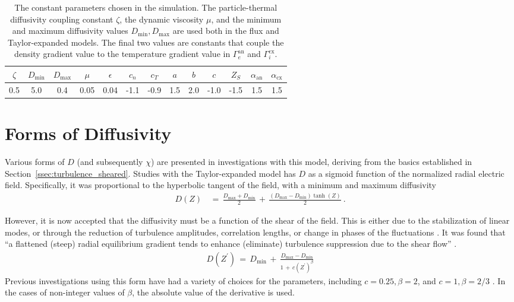 \begin{table}[h] %
\centering
	\begin{tabular}{cccc|ccccccc|cc}
		$\zeta$ & $D_\text{min}$ & $D_\text{max}$ & $\mu$ & $\epsilon$ & $c_n$ & $c_T$ & $a$ & $b$ & $c$ & $Z_S$ & $\alpha_\text{an}$ & $\alpha_\text{cx}$ \\ \hline
		0.5 & 5.0 & 0.4 & 0.05 & 0.04 & -1.1 & -0.9 & 1.5 & 2.0 & -1.0 & -1.5 & 1.5 & 1.5
	\end{tabular}
	\caption{The constant parameters chosen in the simulation.
	The particle-thermal diffusivity coupling constant $\zeta$, the dynamic viscosity $\mu$, and the minimum and maximum diffusivity values $D_\text{min}, D_\text{max}$ are used both in the flux and Taylor-expanded models.
	The final two values are constants that couple the density gradient value to the temperature gradient value in $\Gamma_e^\text{an}$ and $\Gamma_i^\text{cx}$.}
	\label{table:constants}
\end{table}

\section{Forms of Diffusivity}\label{sec:diffusivity}
Various forms of $D$ (and subsequently $\chi$) are presented in investigations with this model, deriving from the basics established in Section~\ref{ssec:turbulence_sheared}.
Studies with the Taylor-expanded model has $D$ as a sigmoid function of the normalized radial electric field.
Specifically, it was proportional to the hyperbolic tangent of the field, with a minimum and maximum diffusivity \cite{itoh_edge_1991, zohm_dynamic_1994}
\begin{align} %
	D(Z) \,&=\, \frac{D_\text{max} + D_\text{min}}{2} \,+\,
		\frac{(D_\text{max} - D_\text{min})\tanh(Z)}{2}~.
		\label{eq:Itoh_diffusivity}
\end{align}

However, it is now accepted that the diffusivity must be a function of the shear of the field.
This is either due to the stabilization of linear modes, or through the reduction of turbulence amplitudes, correlation lengths, or change in phases of the fluctuations \cite{connor_review_2000}.
It was found that ``a flattened (steep) radial equilibrium gradient tends to enhance (eliminate) turbulence suppression due to the shear flow'' \cite{zhang_edge_1992}.
\begin{align} %
	D(Z^{\prime}) \,=\, D_\text{min} \,+\, \frac{D_\text{max} - D_\text{min}}
		{1 \,+\, c(Z^{\prime})^{\beta}} \label{eq:shear_diffusivity}
\end{align}
Previous investigations using this form have had a variety of choices for the parameters, including $c = 0.25, \beta = 2$, and $c = 1, \beta = 2/3$ \cite{connor_review_2000} \cite{itoh_theoretical_1994}.
In the cases of non-integer values of $\beta$, the absolute value of the derivative is used.


